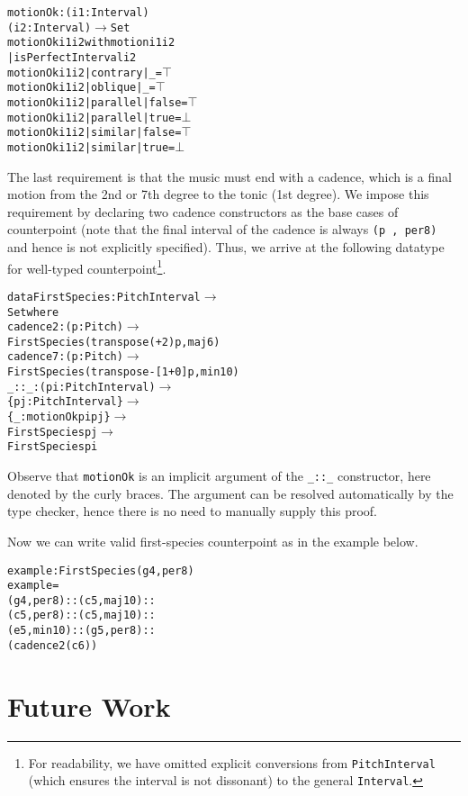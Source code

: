 \documentclass[sigplan,screen]{acmart}
\begin{document}
\begin{alltt}
motionOk : (i1 : Interval)
           (i2 : Interval) \(\rightarrow\) Set
motionOk i1 i2 with motion i1 i2
         | isPerfectInterval i2
motionOk i1 i2 | contrary | \_     = \(\top\)
motionOk i1 i2 | oblique  | \_     = \(\top\)
motionOk i1 i2 | parallel | false = \(\top\)
motionOk i1 i2 | parallel | true  = \(\bot\)
motionOk i1 i2 | similar  | false = \(\top\)
motionOk i1 i2 | similar  | true  = \(\bot\)
\end{alltt}

The last requirement is that the music must end with a cadence,
which is a final motion from the 2nd or 7th degree to the tonic 
(1st degree). 
We impose this requirement by declaring two cadence constructors 
as the base cases of counterpoint (note that the final interval of
the cadence is always \texttt{(p\ ,\ per8)} and hence is not explicitly
specified).
Thus, we arrive at the following datatype for well-typed counterpoint\footnote{
For readability, we have omitted explicit conversions 
from \texttt{PitchInterval} (which ensures the interval is not dissonant) 
to the general \texttt{Interval}.}.

\begin{alltt}
data FirstSpecies : PitchInterval \(\rightarrow\)
                    Set where
  cadence2 : (p : Pitch) \(\rightarrow\)
    FirstSpecies (transpose (+ 2) p , maj6)
  cadence7 : (p : Pitch) \(\rightarrow\)
    FirstSpecies (transpose -[1+ 0 ] p , min10)
  \_::\_ : (pi : PitchInterval) \(\rightarrow\)
         \{pj : PitchInterval\} \(\rightarrow\)
         \{\_ : motionOk pi pj\} \(\rightarrow\)
         FirstSpecies pj \(\rightarrow\)
         FirstSpecies pi
\end{alltt}

\noindent Observe that \texttt{motionOk} is an implicit argument of 
the \texttt{\_::\_} constructor, here denoted by the curly braces. 
The argument can be resolved automatically by the type checker,
hence there is no need to manually supply this proof. 

Now we can write valid first-species counterpoint as in the 
example below.

\begin{alltt}
example : FirstSpecies (g 4 , per8)
example = 
  (g 4 , per8) :: (c 5 , maj10) ::
  (c 5 , per8) :: (c 5 , maj10) ::
  (e 5 , min10) :: (g 5 , per8) ::
  (cadence2 (c 6))
\end{alltt}


\section{Future Work}
\end{document}
